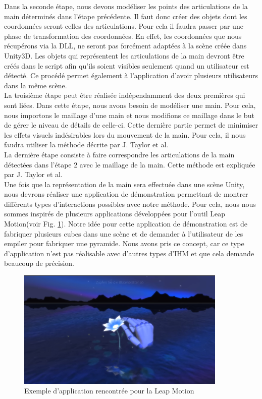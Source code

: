Dans la seconde étape, nous devons modéliser les points des articulations de la main déterminés 
dans l'étape précédente. Il faut donc créer des objets dont les coordonnées seront celles des articulations.
Pour cela il faudra passer par une phase de transformation des coordonnées. En effet, les coordonnées
que nous récupérons via la DLL, ne seront pas forcément adaptées à la scène créée dans Unity3D. Les 
objets qui représentent les articulations de la main devront être créés dans le script afin qu'ils 
soient visibles seulement quand un utilisateur est détecté. Ce procédé permet également à l'application
d'avoir plusieurs utilisateurs dans la même scène.\\

La troisième étape peut être réalisée indépendamment des deux premières qui sont liées. Dans cette étape,
nous avons besoin de modéliser une main. Pour cela, nous importons le maillage d'une main et
nous modifions ce maillage dans le but de gérer le niveau de détails de celle-ci. Cette dernière
partie permet de minimiser les effets visuels indésirables lors du mouvement de la main.
Pour cela, il nous faudra utiliser la méthode décrite par J. Taylor et al\cite{export:217428}.\\

La dernière étape consiste à faire correspondre les articulations de la main détectées dans l'étape 2 avec
le maillage de la main. Cette méthode est expliquée par J. Taylor et al\cite{export:217428}.\\

Une fois que la représentation de la main sera effectuée dans une scène Unity, nous devrons réaliser une 
application de démonstration permettant de montrer différents types d'interactions possibles avec notre 
méthode. Pour cela, nous nous sommes inspirés de plusieurs applications développées pour l'outil
Leap Motion(voir Fig. \ref{fig:example}). Notre idée pour cette application de démonstration est de fabriquer plusieurs cubes dans 
une scène et de demander à l'utilisateur de les empiler pour fabriquer une pyramide. Nous avons pris
ce concept, car ce type d'application n'est pas réalisable avec d'autres types d'IHM et que cela demande
beaucoup de précision.

\begin{figure}[!h]
  \begin{center}
    \includegraphics[width=10cm]{images/exampleHand.png}
    \caption{Exemple d'application rencontrée pour la Leap Motion}
    \label{fig:example}
  \end{center}
\end{figure}

